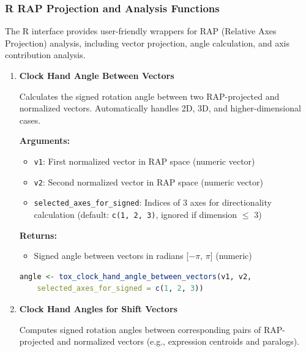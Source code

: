 \documentclass[11pt]{article}
\begin{document}
\subsubsection{R RAP Projection and Analysis Functions}

The R interface provides user-friendly wrappers for RAP (Relative Axes Projection) analysis, including vector projection, angle calculation, and axis contribution analysis.

\begin{enumerate}
    \item \textbf{Clock Hand Angle Between Vectors}

    Calculates the signed rotation angle between two RAP-projected and normalized vectors. Automatically handles 2D, 3D, and higher-dimensional cases.
    
    \textbf{Arguments:}
    \begin{itemize}
        \item \texttt{v1}: First normalized vector in RAP space (numeric vector)
        \item \texttt{v2}: Second normalized vector in RAP space (numeric vector)
        \item \texttt{selected\_axes\_for\_signed}: Indices of 3 axes for directionality calculation (default: \texttt{c(1, 2, 3)}, ignored if dimension $\leq$ 3)
    \end{itemize}
    \textbf{Returns:}
    \begin{itemize}
        \item Signed angle between vectors in radians [$-\pi$, $\pi$] (numeric)
    \end{itemize}
\begin{lstlisting}[language=R, caption={Signed Angle Between Vectors}]
angle <- tox_clock_hand_angle_between_vectors(v1, v2, 
    selected_axes_for_signed = c(1, 2, 3))
\end{lstlisting}

    \item \textbf{Clock Hand Angles for Shift Vectors}

    Computes signed rotation angles between corresponding pairs of RAP-projected and normalized vectors (e.g., expression centroids and paralogs).
    

\end{enumerate}
\end{document}
